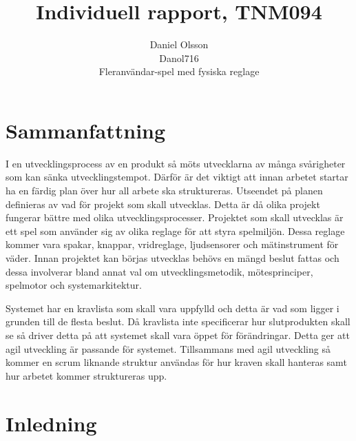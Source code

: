 \documentclass[a4paper,12pt,oneside,final]{extbook}
\title{Individuell rapport, TNM094}
\author{Daniel Olsson \\ Danol716\\Fleranvändar-spel med fysiska reglage}
\begin{document}
\pagestyle{empty}
\thispagestyle{empty}

\frontmatter

\maketitle

\pagestyle{fancy}

\chapter{Sammanfattning}

I en utvecklingsprocess av en produkt så möts utvecklarna av många svårigheter som kan sänka utvecklingstempot. Därför är det viktigt att innan arbetet startar ha en färdig plan över hur all arbete ska struktureras. Utseendet på planen definieras av vad för projekt som skall utvecklas. Detta är då olika projekt fungerar bättre med olika utvecklingsprocesser. Projektet som skall utvecklas är ett spel som använder sig av olika reglage för att styra spelmiljön. Dessa reglage kommer vara spakar, knappar, vridreglage, ljudsensorer och mätinstrument för väder. Innan projektet kan börjas utvecklas behövs en mängd beslut fattas och dessa involverar bland annat val om utvecklingsmetodik, mötesprinciper, spelmotor och systemarkitektur. 

Systemet har en kravlista som skall vara uppfylld och detta är vad som ligger i grunden till de flesta beslut. Då kravlista inte specificerar hur slutprodukten skall se så driver detta på att systemet skall vara öppet för förändringar. Detta ger att agil utveckling är passande för systemet. Tillsammans med agil utveckling så kommer en scrum liknande struktur användas för hur kraven skall hanteras samt hur arbetet kommer struktureras upp.
 

  



\tableofcontents

\cleardoublepage
{}
\listoffigures

\cleardoublepage
{}
\listoftables

\mainmatter

\chapter{Inledning}
\label{ch:inledning}
\end{document}
